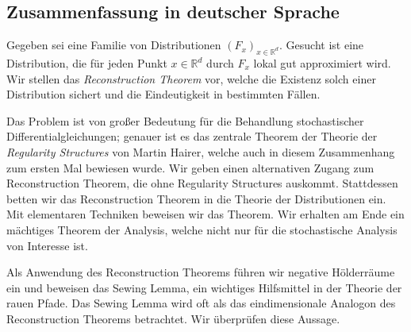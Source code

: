 \documentclass[masters]{ucbthesis}
\theoremstyle{definition}
\begin{document}
\begin{alwayssingle}
\section*{Zusammenfassung in deutscher Sprache}

Gegeben sei eine Familie von Distributionen \( (F_x)_{x \in \mathbb{R}^d} \). Gesucht ist eine Distribution, die für jeden Punkt \( x \in \mathbb{R}^d \) durch \( F_x \) lokal gut approximiert wird. Wir stellen das \emph{Reconstruction Theorem} vor, welche die Existenz solch einer Distribution sichert und die Eindeutigkeit in bestimmten Fällen. 

Das Problem ist von großer Bedeutung für die Behandlung stochastischer Differentialgleichungen; genauer ist es das zentrale Theorem der Theorie der \emph{Regularity Structures} von Martin Hairer, welche auch in diesem Zusammenhang zum ersten Mal bewiesen wurde. Wir geben einen alternativen Zugang zum Reconstruction Theorem, die ohne Regularity Structures auskommt. Stattdessen betten wir das Reconstruction Theorem in die Theorie der Distributionen ein. Mit elementaren Techniken beweisen wir das Theorem. Wir erhalten am Ende ein mächtiges Theorem der Analysis, welche nicht nur für die stochastische Analysis von Interesse ist.

Als Anwendung des Reconstruction Theorems führen wir negative Hölderräume ein und beweisen das Sewing Lemma, ein wichtiges Hilfsmittel in der Theorie der rauen Pfade. Das Sewing Lemma wird oft als das eindimensionale Analogon des Reconstruction Theorems betrachtet. Wir überprüfen diese Aussage.

\end{alwayssingle}



\begin{frontmatter}


\tableofcontents
\clearpage


\end{frontmatter}

\pagestyle{headings}



% 






\printbibliography

\end{document}
